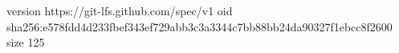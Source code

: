 version https://git-lfs.github.com/spec/v1
oid sha256:e578fdd4d233fbef343ef729abb3c3a3344c7bb88bb24da90327f1ebcc8f2600
size 125

